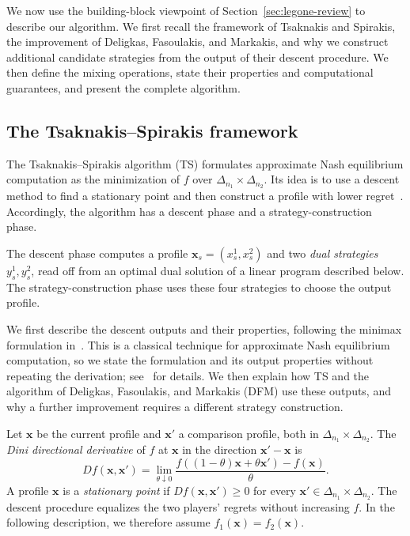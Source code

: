 \documentclass[11pt]{article}
\theoremstyle{remark}
\theoremstyle{plain}
\begin{document}
We now use the building-block viewpoint of
Section~\ref{sec:legone-review} to describe our algorithm. We first
recall the framework of Tsaknakis and Spirakis, the improvement of
Deligkas, Fasoulakis, and Markakis, and why we construct additional
candidate strategies from the output of their descent procedure. We
then define the mixing operations, state
their properties and computational guarantees, and present the
complete algorithm.

\subsection{The Tsaknakis--Spirakis framework}
\label{sec:ts-framework}
\label{sec:motivation}

The Tsaknakis--Spirakis algorithm (TS) formulates approximate Nash
equilibrium computation as the minimization of $f$ over
$\Delta_{n_1}\times\Delta_{n_2}$. Its idea is to use a descent method
to find a stationary point and then construct a profile with lower
regret~\cite{ts2008,tightness2023}. Accordingly, the algorithm has a
descent phase and a strategy-construction phase.

The descent phase computes a profile
$\boldsymbol{x}_s=(x_s^1,x_s^2)$ and two \emph{dual strategies}
$y_s^1,y_s^2$, read off from an optimal dual solution of a linear
program described below. The strategy-construction phase uses these
four strategies to choose the output profile.

We first describe the descent outputs and their properties, following
the minimax formulation in~\cite{tightness2023}. This is a classical
technique for approximate Nash equilibrium computation, so we state
the formulation and its output properties without repeating the
derivation; see~\cite{ts2008,tightness2023} for details.
We then explain how
TS and the algorithm of Deligkas, Fasoulakis, and Markakis (DFM) use
these outputs, and why a further improvement requires a different
strategy construction.

Let $\boldsymbol{x}$ be the current profile and $\boldsymbol{x}'$ a
comparison profile, both in $\Delta_{n_1}\times\Delta_{n_2}$.
The \emph{Dini directional derivative} of $f$ at
$\boldsymbol{x}$ in the direction $\boldsymbol{x}'-\boldsymbol{x}$ is
\[
 Df(\boldsymbol{x},\boldsymbol{x}')
 =\lim_{\theta\downarrow0}
   \frac{f((1-\theta)\boldsymbol{x}+\theta\boldsymbol{x}')
                 -f(\boldsymbol{x})}{\theta}.
\]
A profile $\boldsymbol{x}$ is a \emph{stationary point} if
$Df(\boldsymbol{x},\boldsymbol{x}')\ge0$ for every
$\boldsymbol{x}'\in\Delta_{n_1}\times\Delta_{n_2}$.
The descent procedure equalizes the two players' regrets without
increasing $f$. In the following description, we therefore assume
$f_1(\boldsymbol{x})=f_2(\boldsymbol{x})$.
\end{document}
